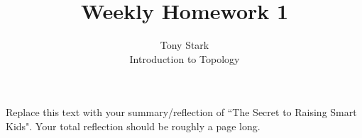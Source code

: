 \documentclass[12pt]{article}
\begin{document}
 
 
\title{Weekly Homework 1}
\author{Tony Stark\\ %
Introduction to Topology}

\maketitle

Replace this text with your summary/reflection of ``The Secret to Raising Smart Kids".  Your total reflection should be roughly a page long.
 
 
\end{document}
